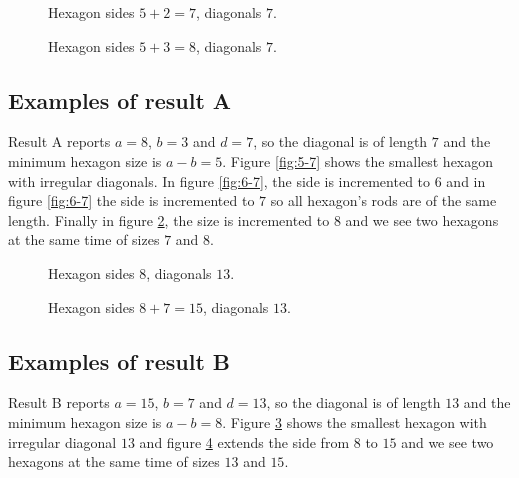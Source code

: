 \documentclass[11pt]{article}
\begin{document}
\begin{figure}
\centering
{}
\caption{Hexagon sides $5+2=7$, diagonals $7$.}
\label{fig:7-7}
\end{figure}


\begin{figure}
\centering
{}
\caption{Hexagon sides $5+3=8$, diagonals $7$.}
\label{fig:8-7}
\end{figure}

\subsection{Examples of result A}
Result A reports $a=8$, $b=3$ and $d=7$, so the diagonal is of length $7$ and the minimum hexagon size is $a - b = 5$.
Figure \ref{fig:5-7} shows the smallest hexagon with irregular diagonals.
In figure \ref{fig:6-7}, the side is incremented to $6$ and in figure \ref{fig:6-7}
the side is incremented to $7$ so all hexagon's rods are of the same length.
Finally in figure \ref{fig:8-7}, the size is incremented to $8$ and we see two
hexagons at the same time of sizes $7$ and $8$.


\begin{figure}
\centering
{}
\caption{Hexagon sides $8$, diagonals $13$.}
\label{fig:8-13}
\end{figure}

\begin{figure}
\centering
{}
\caption{Hexagon sides $8+7=15$, diagonals $13$.}
\label{fig:15-13}
\end{figure}

\subsection{Examples of result B}
Result B reports $a=15$, $b=7$ and $d=13$, so the diagonal is of length $13$ and the minimum
hexagon size is $a - b = 8$. Figure \ref{fig:8-13} shows the smallest hexagon with irregular
diagonal $13$ and figure \ref{fig:15-13} extends the side from $8$ to $15$ and we see two
hexagons at the same time of sizes $13$ and $15$.
\end{document}
